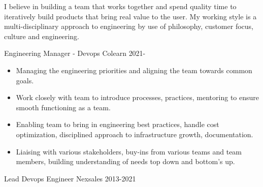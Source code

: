 \documentclass[11pt]{spidercv}
\begin{document}
    





    \begin{MainPart}

		{
			I believe in building a team that works together and spend quality time to iteratively build products that bring real value to the user. My working style is a multi-disciplinary approach to engineering by use of philosophy, customer focus, culture and engineering.

		}
		
    \Experience
        {\ColorHighlight}
		{Engineering Manager - Devops}
		{Colearn}
        {2021-\faUndo}
        {   
            \begin{itemize}
            	\item[\ding{51}] Managing the engineering priorities and aligning the team towards common goals.\\
            	\item[\ding{51}] Work closely with team to introduce processes, practices, mentoring to ensure smooth functioning as a team. \\
 	           \item[\ding{51}] Enabling team to bring in engineering best practices, handle cost optimization, disciplined approach to infrastructure growth, documentation.
 	           \item[\ding{51}] Liaising with various stakeholders, buy-ins from various teams and team members, building understanding of needs top down and bottom's up.
            \end{itemize}        
        }
    \Experience
        {\ColorHighlight}
		{Lead Devops Engineer}
		{Nexsales}
        {2013-2021}
        {  
        	
        		
            
}
\end{MainPart}
\end{document}
